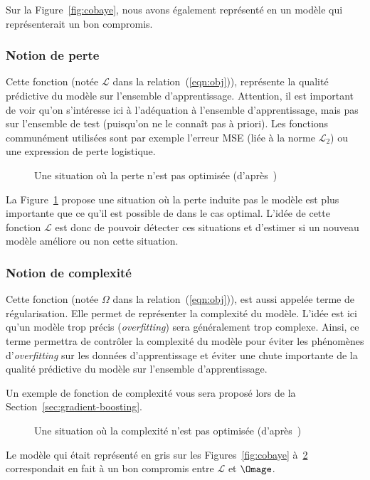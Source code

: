Sur la Figure~\ref{fig:cobaye}, nous avons également représenté en  un modèle qui représenterait un bon compromis.

\subsubsection{Notion de perte}

Cette fonction (notée $\mathcal{L}$ dans la relation~(\ref{eqn:obj})), représente la qualité prédictive du modèle sur l'ensemble d'apprentissage. Attention, il est important de voir qu'on s'intéresse ici à l'adéquation à l'ensemble d'apprentissage, mais pas sur l'ensemble de test (puisqu'on ne le connaît pas à priori). Les fonctions communément utilisées sont par exemple l'erreur MSE (liée à la norme $\mathcal{L}_2$) ou une expression de perte logistique.

\begin{figure}[h]
	\begin{margincap}
	  \centering
	  
	  \caption{Une situation où la perte n'est pas optimisée (d'après~\cite{bib:xgboost_main})}
	  \label{fig:loss}
	\end{margincap}
\end{figure}

La Figure~\ref{fig:loss} propose une situation où la perte induite pas le modèle est plus importante que ce qu'il est possible de dans le cas optimal. L'idée de cette fonction $\mathcal{L}$ est donc de pouvoir détecter ces situations et d'estimer si un nouveau modèle améliore ou non cette situation.

\subsubsection{Notion de complexité}

Cette fonction (notée $\Omega$ dans la relation~(\ref{eqn:obj})), est aussi appelée terme de régularisation. Elle permet de représenter la complexité du modèle. L'idée est ici qu'un modèle trop précis (\textit{overfitting}) sera généralement trop complexe. Ainsi, ce terme permettra de contrôler la complexité du modèle pour éviter les phénomènes d'\textit{overfitting} sur les données d'apprentissage et éviter une chute importante de la qualité prédictive du modèle sur l'ensemble d'apprentissage.

Un exemple de fonction de complexité vous sera proposé lors de la Section~\ref{sec:gradient-boosting}.

\begin{figure}[h]
	\begin{margincap}
	  \centering
	  
	  \caption{Une situation où la complexité n'est pas optimisée (d'après~\cite{bib:xgboost_main})}
	  \label{fig:complexity}
	\end{margincap}
\end{figure}

Le modèle qui était représenté en gris sur les Figures~\ref{fig:cobaye} à~\ref{fig:complexity} correspondait en fait à un bon compromis entre $\mathcal{L}$ et $\Omage$.